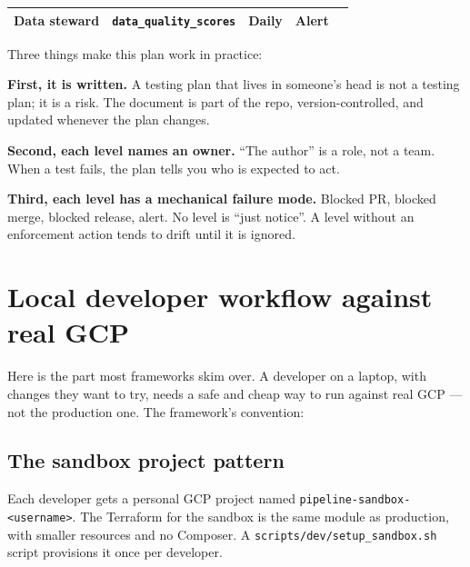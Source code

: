 \documentclass[
  11pt,
  british,
  oneside]{book}
\begin{document}
\begin{longtable}[]{@{}lllll@{}}
\begin{minipage}[t]{0.17\columnwidth}
Data steward\strut
\end{minipage} & \begin{minipage}[t]{0.17\columnwidth}\raggedright
\texttt{data\_quality\_scores}\strut
\end{minipage} & \begin{minipage}[t]{0.17\columnwidth}\raggedright
Daily\strut
\end{minipage} & \begin{minipage}[t]{0.17\columnwidth}\raggedright
Alert\strut
\end{minipage}\tabularnewline
\bottomrule
\end{longtable}

Three things make this plan work in practice:

\textbf{First, it is written.} A testing plan that lives in someone's
head is not a testing plan; it is a risk. The document is part of the
repo, version-controlled, and updated whenever the plan changes.

\textbf{Second, each level names an owner.} ``The author'' is a role,
not a team. When a test fails, the plan tells you who is expected to
act.

\textbf{Third, each level has a mechanical failure mode.} Blocked PR,
blocked merge, blocked release, alert. No level is ``just notice''. A
level without an enforcement action tends to drift until it is ignored.

\hypertarget{local-developer-workflow-against-real-gcp}{%
\section{Local developer workflow against real
GCP}\label{local-developer-workflow-against-real-gcp}}

Here is the part most frameworks skim over. A developer on a laptop,
with changes they want to try, needs a safe and cheap way to run against
real GCP --- not the production one. The framework's convention:

\hypertarget{the-sandbox-project-pattern}{%
\subsection{The sandbox project
pattern}\label{the-sandbox-project-pattern}}

Each developer gets a personal GCP project named
\texttt{pipeline-sandbox-\textless{}username\textgreater{}}. The
Terraform for the sandbox is the same module as production, with smaller
resources and no Composer. A \texttt{scripts/dev/setup\_sandbox.sh}
script provisions it once per developer.
\end{document}
